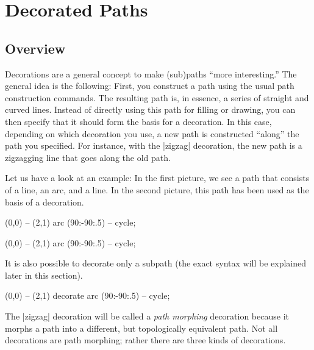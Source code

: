 %
%
%

\section{Decorated Paths}

\label{section-tikz-decorations}


\subsection{Overview}

Decorations are a general concept to make (sub)paths ``more
interesting.'' The general idea is the following: First, you construct
a path using the usual path construction commands. The resulting path
is, in essence, a series of straight and curved lines. Instead of
directly using this path for filling or drawing, you can then specify
that it should form the basis for a decoration. In this case,
depending on which decoration you use, a new path is constructed
``along'' the path you specified. For instance, with the |zigzag|
decoration, the new path is a zigzagging line that goes along the old
path.

Let us have a look at an example: In the first picture, we see a path
that consists of a line, an arc, and a line. In the second picture,
this path has been used as the basis of a decoration.

\begin{codeexample}[]
\tikz \fill
  [fill=blue!20,draw=blue,thick] (0,0) -- (2,1) arc (90:-90:.5) -- cycle;
\end{codeexample}
\begin{codeexample}[]
\tikz \fill [decorate,decoration={zigzag}]
  [fill=blue!20,draw=blue,thick] (0,0) -- (2,1) arc (90:-90:.5) -- cycle;
\end{codeexample}

It is also possible to decorate only a subpath (the exact syntax will
be explained later in this section).
\begin{codeexample}[]
\tikz \fill [decoration={zigzag}]
  [fill=blue!20,draw=blue,thick] (0,0) -- (2,1)
    decorate { arc (90:-90:.5) } -- cycle;
\end{codeexample}

The |zigzag| decoration will be called a \emph{path
  morphing} decoration because it morphs a path into a different, but
topologically equivalent path. Not all decorations are path
morphing; rather there are three kinds of decorations.


